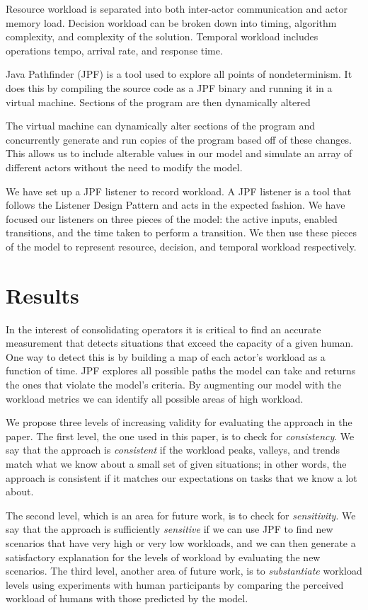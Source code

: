Resource workload is separated into both inter-actor communication and actor
memory load. Decision workload can be broken down into timing, algorithm complexity, and complexity of the solution. Temporal workload includes operations tempo, arrival rate, and response time.

Java Pathfinder (JPF) is a tool used to explore all points of nondeterminism.
It does this by compiling the source code as a JPF binary and
running it in a virtual machine.
Sections of the program are then dynamically altered 

The virtual machine can dynamically alter sections of the program and concurrently generate and run copies of the program
based off of these changes. This allows us to include alterable values in our
model and simulate an array of different actors without the need to modify the
model.

We have set up a JPF listener to record workload. A JPF listener is a tool that
follows the Listener Design Pattern and acts in the expected fashion. We have
focused our listeners on three pieces of the model: the active inputs, enabled
transitions, and the time taken to perform a transition. We then use these
pieces of the model to represent resource, decision, and temporal workload respectively.

\section{Results}

In the interest of consolidating operators it is critical to find an accurate measurement that detects situations that exceed the capacity of a given human. One way to detect this is by building a map of each actor's workload as a function of time. JPF explores all possible paths the model can take and returns the ones that violate the model's criteria. By augmenting our model with the workload metrics we can identify all possible areas of high workload. 

We propose three levels of increasing validity for evaluating the approach in the paper.  The first level, the one used in this paper, is to check for {\em consistency}.  We say that the approach is {\em consistent} if the workload peaks, valleys, and trends match what we know about a small set of given situations; in other words, the approach is consistent if it matches our expectations on tasks that we know a lot about.  

The second level, which is an area for future work, is to check for {\em sensitivity}.  We say that  the approach is sufficiently {\em sensitive} if we can use JPF to find new scenarios that have very high or very low workloads, and we can then generate a satisfactory explanation for the levels of workload by evaluating the new scenarios.  The third level, another area of future work, is to {\em substantiate} workload levels using experiments with human participants by comparing the perceived workload of humans with those predicted by the model.

